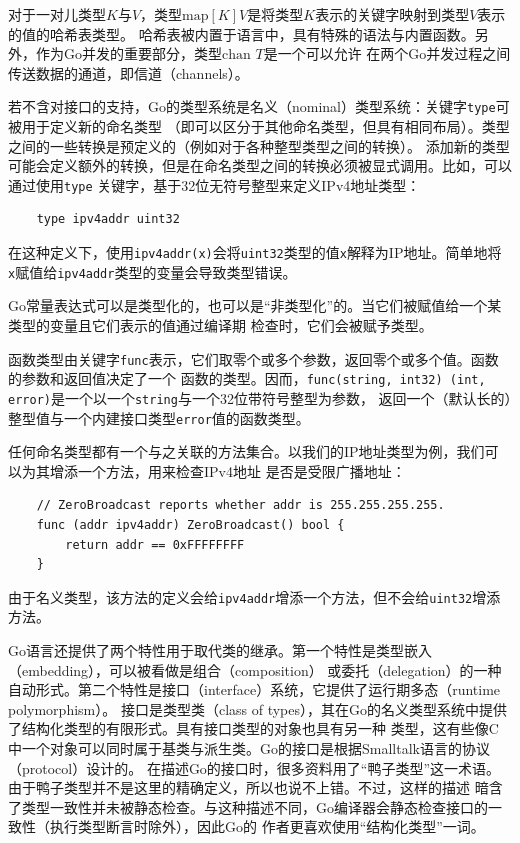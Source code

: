 \documentclass[12pt]{article}
\newcommand{\CC}{C\nolinebreak\hspace{-.05em}\raisebox{.4ex}{\tiny\bf +}%
\nolinebreak\hspace{-.10em}\raisebox{.4ex}{\tiny\bf +}}
\begin{document}
\indent{}对于一对儿类型$K$与$V$，类型$\mathrm{map}[K]V$是将类型$K$表示的关键字映射到类型$V$表示的值的哈希表类型。
哈希表被内置于语言中，具有特殊的语法与内置函数。另外，作为Go并发的重要部分，类型$\textrm{chan }T$是一个可以允许
在两个Go并发过程之间传送数据的通道，即信道（channels）。

\indent{}若不含对接口的支持，Go的类型系统是名义（nominal）类型系统：关键字\texttt{type}可被用于定义新的命名类型
（即可以区分于其他命名类型，但具有相同布局）。类型之间的一些转换是预定义的（例如对于各种整型类型之间的转换）。
添加新的类型可能会定义额外的转换，但是在命名类型之间的转换必须被显式调用。比如，可以通过使用\texttt{type}
关键字，基于32位无符号整型来定义IPv4地址类型：
\begin{verbatim}
    type ipv4addr uint32
\end{verbatim}
\noindent{}在这种定义下，使用\texttt{ipv4addr(x)}会将\texttt{uint32}类型的值\texttt{x}解释为IP地址。简单地将
\texttt{x}赋值给\texttt{ipv4addr}类型的变量会导致类型错误。

\indent{}Go常量表达式可以是类型化的，也可以是“非类型化”的。当它们被赋值给一个某类型的变量且它们表示的值通过编译期
检查时，它们会被赋予类型。

\indent{}函数类型由关键字\texttt{func}表示，它们取零个或多个参数，返回零个或多个值。函数的参数和返回值决定了一个
函数的类型。因而，\texttt{func(string, int32) (int, error)}是一个以一个\texttt{string}与一个32位带符号整型为参数，
返回一个（默认长的）整型值与一个内建接口类型\texttt{error}值的函数类型。

\indent{}任何命名类型都有一个与之关联的方法集合。以我们的IP地址类型为例，我们可以为其增添一个方法，用来检查IPv4地址
是否是受限广播地址：
\begin{verbatim}
    // ZeroBroadcast reports whether addr is 255.255.255.255.
    func (addr ipv4addr) ZeroBroadcast() bool {
        return addr == 0xFFFFFFFF
    }
\end{verbatim}
由于名义类型，该方法的定义会给\texttt{ipv4addr}增添一个方法，但不会给\texttt{uint32}增添方法。

\indent{}Go语言还提供了两个特性用于取代类的继承。第一个特性是类型嵌入（embedding），可以被看做是组合（composition）
或委托（delegation）的一种自动形式。第二个特性是接口（interface）系统，它提供了运行期多态（runtime polymorphism）。
接口是类型类（class of types），其在Go的名义类型系统中提供了结构化类型的有限形式。具有接口类型的对象也具有另一种
类型，这有些像{\CC}中一个对象可以同时属于基类与派生类。Go的接口是根据Smalltalk语言的协议（protocol）设计的。
在描述Go的接口时，很多资料用了“鸭子类型”这一术语。由于鸭子类型并不是这里的精确定义，所以也说不上错。不过，这样的描述
暗含了类型一致性并未被静态检查。与这种描述不同，Go编译器会静态检查接口的一致性（执行类型断言时除外），因此Go的
作者更喜欢使用“结构化类型”一词。
\end{document}
